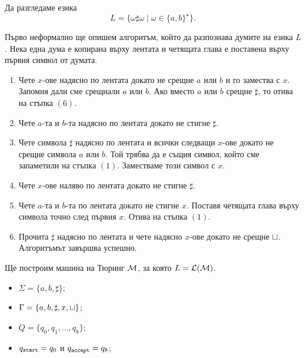 \begin{example}
  Да разгледаме езика
  \[L = \{\omega \sharp \omega \mid \omega\in\{a,b\}^\star\}.\]

  Първо неформално ще опишем алгоритъм, който да разпознава думите на езика $L$.
  Нека една дума е копирана върху лентата и четящата глава е поставена върху първия символ от думата.
  \begin{enumerate}[(1)]
  \item
    Чете $x$-ове надясно по лентата докато не срещне $a$ или $b$ и го замества с $x$.
    Запомня дали сме срещнали $a$ или $b$.
    Ако вместо $a$ или $b$ срещне $\sharp$, то отива на стъпка $(6)$.
  \item
    Чете $a$-та и $b$-та надясно по лентата докато не стигне $\sharp$. 
  \item
    Чете символа $\sharp$ надясно по лентата и всички следващи $x$-ове докато не срещне символа $a$ или $b$.
    Той трябва да е същия символ, който сме запаметили на стъпка $(1)$.
    Заместваме този символ с $x$.
  \item
    Чете $x$-ове наляво по лентата докато не стигне $\sharp$.
  \item
    Чете $a$-та и $b$-та по лентата докато не стигне $x$.
    Поставя четящата глава върху символа точно след първия $x$.
    Отива на стъпка $(1)$.
  \item
    Прочита $\sharp$ надясно по лентата и чете надясно $x$-ове докато не срещне $\sqcup$.
    Алгоритъмът завършва успешно.
  \end{enumerate}
  Ще построим машина на Тюринг $\mathcal{M}$, за която $L = \mathcal{L}(\mathcal{M})$.
  \begin{itemize}
  \item 
    $\Sigma = \{a,b,\sharp\}$;
  \item
    $\Gamma = \{a,b,\sharp,x,\sqcup\}$;
  \item
    $Q = \{q_0,q_1,\dots,q_8\}$;
  \item
    $q_{\texttt{start}} = q_0$ и $q_{\texttt{accept}} = q_8$;
  \end{itemize}

  \begin{framed}
  \begin{figure}[H]
    \begin{center}
\end{center}
\end{figure}
\end{framed}
\end{example}
